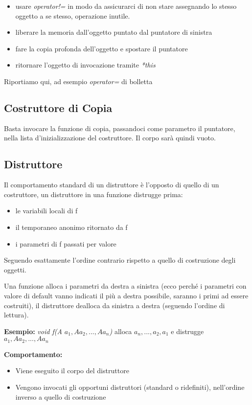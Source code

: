 \begin{itemize}
	\item usare \textit{operator!=} in modo da assicurarci di non stare assegnando lo stesso oggetto a se stesso, operazione inutile.
	\item liberare la memoria dall'oggetto puntato dal puntatore di sinistra
	\item fare la copia profonda dell'oggetto e spostare il puntatore
	\item ritornare l'oggetto di invocazione tramite \textit{*this} 
\end{itemize}

Riportiamo qui, ad esempio \textit{operator=} di bolletta



\subsection{Costruttore di Copia}
Basta invocare la funzione di copia, passandoci come parametro il puntatore, nella lista d'inizializzazione del costruttore. Il corpo sarà quindi vuoto.

\subsection{Distruttore}
Il comportamento standard di un distruttore è l'opposto di quello di un costruttore, un distruttore in una funzione distrugge prima:

\begin{itemize}
	\item le variabili locali di f
	\item il temporaneo anonimo ritornato da f
	\item i parametri di f passati per valore
\end{itemize}

Seguendo esattamente l'ordine contrario rispetto a quello di costruzione degli oggetti.

Una funzione alloca i parametri da destra a sinistra (ecco perché i parametri con valore di default vanno indicati il più a destra possibile, saranno i primi ad essere costruiti), il distruttore dealloca da sinistra a destra (seguendo l'ordine di lettura).

\textbf{Esempio:}
\textit{void f(A $a_{1}, A a_{2}, ..., A a_{n}$)} alloca $a_{n}, ..., a_{2}, a_{1}$ e distrugge $a_{1}, A a_{2}, ..., A a_{n}$

\textbf{Comportamento:} 
\begin{itemize}
	\item Viene eseguito il corpo del distruttore
	\item Vengono invocati gli opportuni distruttori (standard o ridefiniti), nell'ordine inverso a quello di costruzione
\end{itemize}

